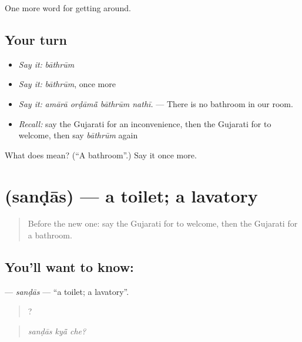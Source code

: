 \begin{grammarlens}[title={What you've built}]
One more word for getting around.
\end{grammarlens}

\subsection*{Your turn}
\begin{itemize}
\raggedright
  \item \emph{Say it:} \emph{bāthrūm}
  \item \emph{Say it:} \emph{bāthrūm}, once more
  \item \emph{Say it:} \emph{amārā orḍāmā̃ bāthrūm nathī.} — There is no bathroom in our room.
  \item \emph{Recall:} say the Gujarati for an inconvenience, then the Gujarati for to welcome, then say \emph{bāthrūm} again
\end{itemize}

\begin{tcolorbox}[breakable,colback=teal!4,colframe=teal!35!black,title={Before you move on}]
What does  mean? (\textquotedblleft{}A bathroom\textquotedblright{}.) Say it once more.
\end{tcolorbox}
\section[\texorpdfstring{\gu{સંડાસ} (sanḍās)}{સંડાસ (sanḍās)}]{ (sanḍās) — a toilet; a lavatory}

\label{lesson:GU-C410-sandas}



\begin{quote}
Before the new one: say the Gujarati for to welcome, then the Gujarati for a bathroom.
\end{quote}

\subsection*{You'll want to know: }
\textbf{} — \emph{sanḍās} — \textquotedblleft{}a toilet; a lavatory\textquotedblright{}.

\begin{quote}
  ?
\end{quote}

\begin{quote}
\emph{sanḍās kyā̃ che?}
\end{quote}

